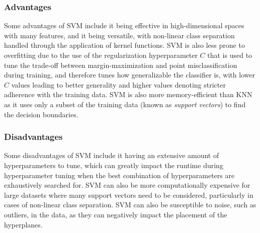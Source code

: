 \documentclass[journal,twocolumn,12pt,twoside]{IEEEtran}
\begin{document}
\subsubsection{Advantages}
Some advantages of SVM include it being effective in high-dimensional spaces with many features, and it being versatile, with non-linear class separation handled through the application of kernel functions. SVM is also less prone to overfitting due to the use of the regularization hyperparameter $C$ that is used to tune the trade-off between margin-maximization and point misclassification during training, and therefore tunes how generalizable the classifier is, with lower $C$ values leading to better generality and higher values denoting stricter adherence with the training data. SVM is also more memory-efficient than KNN as it uses only a subset of the training data (known as \textit{support vectors}) to find the decision boundaries.
\subsubsection{Disadvantages}
Some disadvantages of SVM include it having an extensive amount of hyperparameters to tune, which can greatly impact the runtime during hyperparameter tuning when the best combination of hyperparameters are exhaustively searched for. SVM can also be more computationally expensive for large datasets where many support vectors need to be considered, particularly in cases of non-linear class separation. SVM can also be susceptible to noise, such as outliers, in the data, as they can negatively impact the placement of the hyperplanes.
\end{document}
